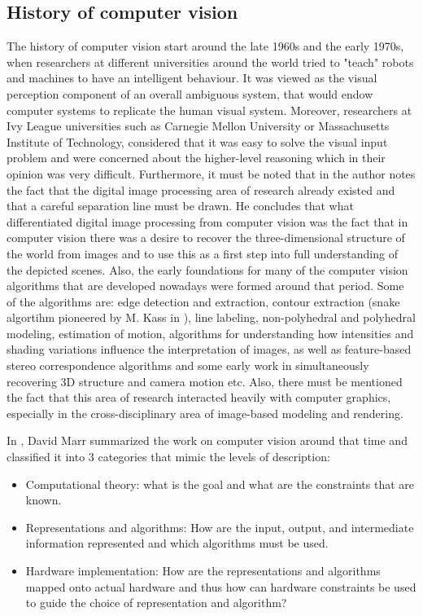 \documentclass[12pt,a4paper,twoside]{report}
\begin{document}
\subsection{History of computer vision}
The history of computer vision start around the late 1960s and the early 1970s, when researchers at different universities around the world tried to "teach" robots and machines to have an intelligent behaviour. It was viewed as the visual perception component of an overall ambiguous system, that would endow computer systems to replicate the human visual system. Moreover, researchers at Ivy League universities such as Carnegie Mellon University or Massachusetts Institute of Technology, considered that it was easy to solve the visual input problem and were concerned about the higher-level reasoning which in their opinion was very difficult\cite{article-cvapp}\cite{article-cvhistory}\cite{article-boden}. Furthermore, it must be noted that in \cite{article-cvhistory} the author notes the fact that the digital image processing area of research already existed and that a careful separation line must be drawn. He concludes that what differentiated digital image processing from computer vision was the fact that in computer vision there was a desire to recover the
three-dimensional structure of the world from images and to use this as a first step into full understanding of the depicted scenes. Also, the early foundations for many of the computer vision algorithms that are developed nowadays were formed around that period. Some of the algorithms are: edge detection and extraction, contour extraction (snake algortihm pioneered by M. Kass in \cite{article-snake}), line labeling, non-polyhedral and polyhedral modeling, estimation of motion, algorithms for understanding how intensities and shading variations influence the interpretation of images, as well as feature-based stereo correspondence algorithms\cite{article-grimson} and some early work in simultaneously recovering 3D structure and camera motion\cite{article-longuet} etc. Also, there must be mentioned the fact that this area of research interacted heavily with computer graphics, especially in the
cross-disciplinary area of image-based modeling and rendering\cite{article-cvhistory}. \par
In \cite{book-marr}, David Marr summarized the work on computer vision around that time and classified it into 3 categories that mimic the levels of description:
\begin{itemize}
    \item Computational theory: what is the goal and what are the
constraints that are known.
    \item Representations and algorithms: How are the input, output, and intermediate information represented and which algorithms must be used.
    \item Hardware implementation: How are the representations and algorithms mapped onto actual hardware and thus how can hardware constraints be used to guide the choice of representation and algorithm? 
\end{itemize}\par
\end{document}
